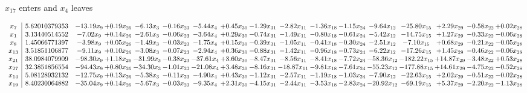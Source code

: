 \documentclass[9pt]{article}
\begin{document}
 $ x_{17} $ enters and $ x_{4} $ leaves 

 \[\begin{array}{c| c c@{\hskip 2pt} c@{\hskip 2pt} c@{\hskip 2pt} c@{\hskip 2pt} c@{\hskip 2pt} c@{\hskip 2pt} c@{\hskip 2pt} c@{\hskip 2pt} c@{\hskip 2pt} c@{\hskip 2pt} c@{\hskip 2pt} c@{\hskip 2pt} c@{\hskip 2pt} c@{\hskip 2pt} c@{\hskip 2pt} }
 x_{7}   &  5.62010379353 & -13.19 x_{9} & +  0.19 x_{26} & -6.13 x_{3} & -0.16 x_{23} & -5.44 x_{4} & +  0.45 x_{30} & -1.29 x_{31} & -2.82 x_{11} & -1.36 x_{18} & -1.15 x_{24} & -9.64 x_{12} & -25.80 x_{15} & +  2.29 x_{29} & -0.58 x_{22} & +  0.02 x_{28}\\
 x_{1}   &  3.13440514552 & -7.02 x_{9} & +  0.14 x_{26} & -2.61 x_{3} & -0.06 x_{23} & -3.64 x_{4} & +  0.29 x_{30} & -0.74 x_{31} & -1.49 x_{11} & -0.80 x_{18} & -0.61 x_{24} & -5.42 x_{12} & -14.75 x_{15} & +  1.27 x_{29} & -0.33 x_{22} & -0.06 x_{28}\\
 x_{8}   &  1.45066771397 & -3.98 x_{9} & +  0.05 x_{26} & -1.49 x_{3} & -0.03 x_{23} & -1.75 x_{4} & +  0.15 x_{30} & -0.39 x_{31} & -1.05 x_{11} & -0.41 x_{18} & -0.30 x_{24} & -2.51 x_{12} & -7.10 x_{15} & +  0.68 x_{29} & -0.21 x_{22} & -0.05 x_{28}\\
 x_{13}   &  3.51851106877 & -9.11 x_{9} & +  0.10 x_{26} & -3.08 x_{3} & -0.07 x_{23} & -2.94 x_{4} & +  0.36 x_{30} & -0.88 x_{31} & -1.42 x_{11} & -0.96 x_{18} & -0.73 x_{24} & -6.22 x_{12} & -17.26 x_{15} & +  1.45 x_{29} & -0.46 x_{22} & -0.06 x_{28}\\
 x_{21}   &  38.0984079909 & -98.30 x_{9} & +  1.18 x_{26} & -31.99 x_{3} & -0.38 x_{23} & -37.61 x_{4} & +  3.60 x_{30} & -8.47 x_{31} & -8.56 x_{11} & -8.41 x_{18} & -7.72 x_{24} & -58.36 x_{12} & -182.22 x_{15} & + 14.87 x_{29} & -3.48 x_{22} & +  0.53 x_{28}\\
 x_{27}   &  32.3851856554 & -94.43 x_{9} & +  0.80 x_{26} & -34.30 x_{3} & -1.01 x_{23} & -21.08 x_{4} & +  3.48 x_{30} & -8.16 x_{31} & -18.87 x_{11} & -9.81 x_{18} & -7.61 x_{24} & -55.23 x_{12} & -177.88 x_{15} & + 14.61 x_{29} & -4.75 x_{22} & -0.52 x_{28}\\
 x_{14}   &  5.08128932132 & -12.75 x_{9} & +  0.13 x_{26} & -5.38 x_{3} & -0.11 x_{23} & -4.90 x_{4} & +  0.43 x_{30} & -1.12 x_{31} & -2.57 x_{11} & -1.19 x_{18} & -1.03 x_{24} & -7.90 x_{12} & -22.63 x_{15} & +  2.02 x_{29} & -0.51 x_{22} & -0.02 x_{28}\\
 x_{19}   &  8.40230064882 & -35.04 x_{9} & +  0.14 x_{26} & -5.67 x_{3} & -0.03 x_{23} & -9.35 x_{4} & +  2.31 x_{30} & -4.15 x_{31} & -2.44 x_{11} & -3.53 x_{18} & -2.83 x_{24} & -20.92 x_{12} & -69.19 x_{15} & +  5.37 x_{29} & -2.20 x_{22} & -1.13 x_{28}\\

\end{array}\]
\end{document}
